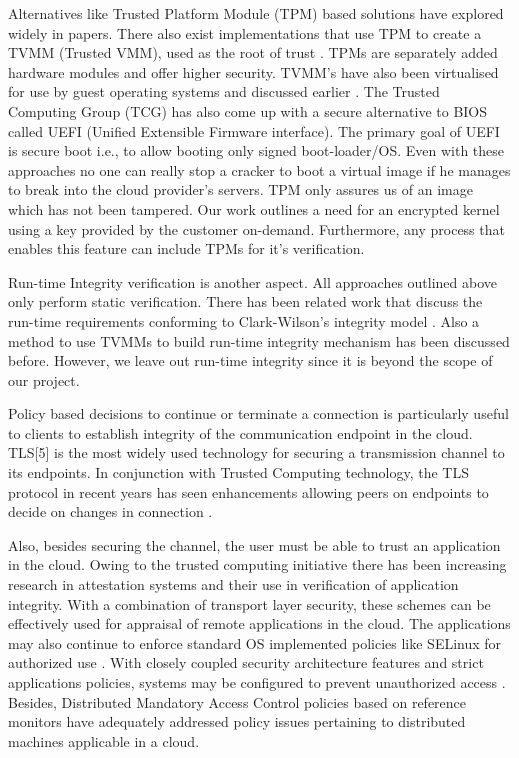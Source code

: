 \documentclass[10pt,twocolumn,pdftex]{article}
\begin{document}
Alternatives like Trusted Platform Module (TPM) \cite{tcg} based solutions have explored widely in papers\cite{Santos09towardstrusted, Garfinkel03terra:a, Haldar04semanticremote, Garfinkel03flexibleos}. There also exist implementations that use TPM to create a TVMM (Trusted VMM), used as the root of trust  \cite{Santos09towardstrusted}. TPMs are separately added hardware modules and offer higher security. TVMM's have also been virtualised for use by guest operating systems and discussed earlier \cite{Berger:2006:VVT:1267336.1267357}. The Trusted Computing Group (TCG) has also come up with a secure alternative to BIOS called UEFI (Unified Extensible Firmware interface)\cite{Intel-UEFI}. The primary goal of UEFI is secure boot i.e., to allow booting only signed boot-loader/OS. Even with these approaches no one can really stop a cracker to boot a virtual image if he manages to break into the cloud provider's servers. TPM only assures us of an image which has not been tampered. Our work outlines a need for an encrypted kernel using a key provided by the customer on-demand. Furthermore, any process that enables this feature can include TPMs for it's verification.

Run-time Integrity verification is another aspect. All approaches outlined above only perform static verification. There has been related work \cite{10.1109/ACSAC.2009.18, Sailer:2004:DIT:1251375.1251391, 10.1109/SRDS.2006.41, Shankar06towardautomated} that discuss the run-time requirements conforming to Clark-Wilson's integrity model \cite{10.1109/SP.1987.10001}. Also a method \cite{Berger:2006:VVT:1267336.1267357} to use TVMMs to build run-time integrity mechanism has been discussed before. However, we leave out run-time integrity since it is beyond the scope of our project. 

Policy based decisions to continue or terminate a connection is particularly useful to clients to establish integrity of the communication endpoint in the cloud. TLS[5] is the most widely used technology for securing a transmission channel to its endpoints. In conjunction with Trusted Computing technology, the TLS protocol in recent years has seen enhancements allowing peers on endpoints to decide on changes in connection \cite{Gasmi:2007:BSC:1314354.1314363}. 

Also, besides securing the channel, the user must be able to trust an application in the cloud. Owing to the trusted computing initiative there has been increasing research in attestation systems \cite{springerlink:10.1007/s10207-011-0124-7} and their use in verification of application integrity. With a combination of transport layer security, these schemes can be effectively used for appraisal of remote applications in the cloud. The applications may also continue to enforce standard OS implemented policies like SELinux for authorized use \cite{Loscocco:2001:IFS:647054.715771}. With closely coupled security architecture features and strict applications policies, systems may be configured to prevent unauthorized access \cite{citeulike:2402639}. Besides, Distributed Mandatory Access Control policies based on reference monitors \cite{4041151} have adequately addressed policy issues pertaining to distributed machines applicable in a cloud.
\end{document}
